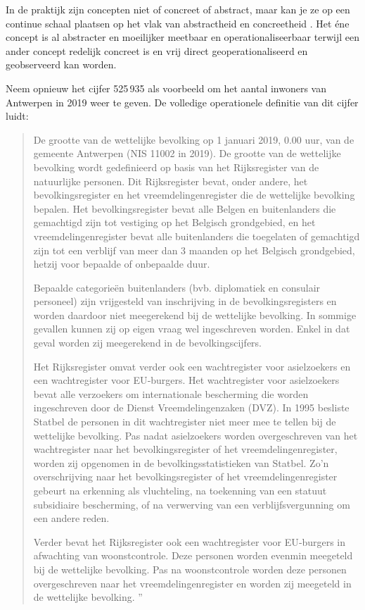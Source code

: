\documentclass[\mainfiledir/00_handleiding_statistiekproductie.tex]{subfiles}
\begin{document}
In de praktijk zijn concepten niet of concreet of abstract, maar kan je ze op een continue schaal plaatsen op het vlak van abstractheid en concreetheid \parencite{neuman2014Social}. Het éne concept is al abstracter en moeilijker meetbaar en operationaliseerbaar terwijl een ander concept redelijk concreet is en vrij direct geoperationaliseerd en geobserveerd kan worden.  
	
Neem opnieuw het cijfer 525\,935 als voorbeeld om het aantal inwoners van Antwerpen in 2019 weer te geven. De volledige operationele definitie van dit cijfer luidt:
\begin{quote} 
	De grootte van de wettelijke bevolking op 1 januari 2019, 0.00 uur, van de gemeente Antwerpen (NIS 11002 in 2019). De grootte van de wettelijke bevolking wordt gedefinieerd op basis van het Rijksregister van de natuurlijke personen. Dit Rijksregister bevat, onder andere, het bevolkingsregister en het vreemdelingenregister die de wettelijke bevolking bepalen. Het bevolkingsregister bevat alle Belgen en buitenlanders die gemachtigd zijn tot vestiging op het Belgisch grondgebied, en het vreemdelingenregister bevat alle buitenlanders die toegelaten of gemachtigd zijn tot een verblijf van meer dan 3 maanden op het Belgisch grondgebied, hetzij voor bepaalde of onbepaalde duur. 
	
	Bepaalde categorieën buitenlanders (bvb. diplomatiek en consulair personeel) zijn vrijgesteld van inschrijving in de bevolkingsregisters en worden daardoor niet meegerekend bij de wettelijke bevolking. In sommige gevallen kunnen zij op eigen vraag wel ingeschreven worden. Enkel in dat geval worden zij meegerekend in de bevolkingscijfers.
		
	Het Rijksregister omvat verder ook een wachtregister voor asielzoekers en een wachtregister voor EU‐burgers. Het wachtregister voor asielzoekers bevat alle verzoekers om internationale bescherming die worden ingeschreven door de Dienst Vreemdelingenzaken (DVZ). In 1995 besliste Statbel de personen in dit wachtregister niet meer mee te tellen bij de wettelijke bevolking. Pas nadat asielzoekers worden overgeschreven van het wachtregister naar het bevolkingsregister of het vreemdelingenregister, worden zij opgenomen in de bevolkingsstatistieken van Statbel. Zo'n overschrijving naar het bevolkingsregister of het vreemdelingenregister gebeurt na erkenning als vluchteling, na toekenning van een statuut subsidiaire bescherming, of na verwerving van een verblijfsvergunning om een andere reden.
		
	Verder bevat het Rijksregister ook een wachtregister voor EU‐burgers in afwachting van woonstcontrole. Deze personen worden evenmin meegeteld bij de wettelijke bevolking. Pas na woonstcontrole worden deze personen overgeschreven naar het vreemdelingenregister en worden zij meegeteld in de wettelijke bevolking.%
	''
\end{quote}
\end{document}
